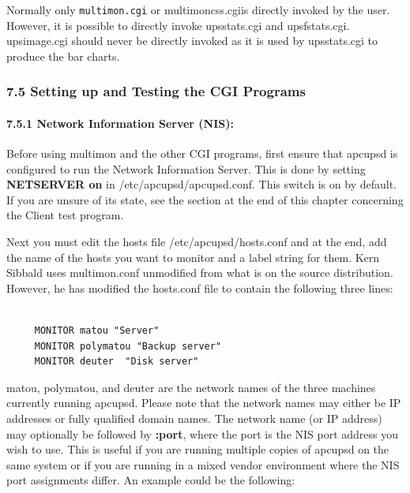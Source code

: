 Normally only {\tt multimon.cgi} or multimoncss.cgiis directly invoked by the
user. However, it is possible to directly invoke upsstats.cgi and
upsfstats.cgi. upsimage.cgi should never be directly invoked as it is used by
upsstats.cgi to produce the bar charts. 

\label{Setting-up-and-Testing-the-CGI-Programs}

\subsubsection*{7.5 Setting up and Testing the CGI Programs}

\label{index-Setup-CGI-programs-122}
\label{index-Testing-CGI-programs-123}

\label{Network-Information-Server-_005bNIS_005d}

\paragraph*{7.5.1 Network Information Server (NIS):}

\label{index-Network-Information-Server-124}
\label{index-NIS-125}
Before using multimon and the other CGI programs, first ensure that apcupsd is
configured to run the Network Information Server. This is done by setting {\bf
NETSERVER on} in /etc/apcupsd/apcupsd.conf.  This switch is on by default.  If
you are unsure of its state, see the section at the end of this chapter
concerning the Client test program.  

Next you must edit the hosts file /etc/apcupsd/hosts.conf and at the end, add
the name of the hosts you want to monitor and a label string for them. Kern
Sibbald uses multimon.conf unmodified from what is on the source distribution.
However, he has modified the hosts.conf file to contain the following three
lines: 

\footnotesize
\begin{verbatim}
     
     MONITOR matou "Server"
     MONITOR polymatou "Backup server"
     MONITOR deuter  "Disk server"
\end{verbatim}
\normalsize

matou, polymatou, and deuter are the network names of the three machines
currently running apcupsd. Please note that the network names may either be IP
addresses or fully qualified domain names.  The network name (or IP address)
may optionally be followed by {\bf :\lt{}port\gt{}}, where the port is the NIS
port address you wish to use. This is useful if you are running multiple
copies of apcupsd on the same system or if you are running in a mixed vendor
environment where the NIS port assignments differ. An example could be the
following: 

